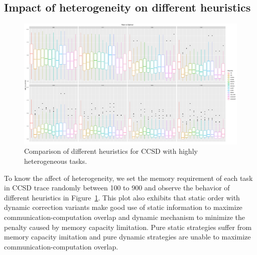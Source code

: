 \documentclass[sigconf]{acmart}
\begin{document}
{	%
	
	\subsection{Impact of heterogeneity on different heuristics}
	\begin{figure}[htb]
		\includegraphics[scale=0.25]{./results/plots/ratio_to_optimal_random_selected_ccsd.pdf}
		\caption{Comparison of different heuristics for CCSD with highly heterogeneous tasks.}
		\label{fig:ratio_to_optimal_ccsd_random}
	\end{figure}	
	
	
	To know the affect of heterogeneity, we set the memory requirement of each task in CCSD trace randomly between 100 to 900 and observe the behavior of different heuristics in  Figure~\ref{fig:ratio_to_optimal_ccsd_random}. This plot also exhibits that static order with dynamic correction variants make good use of static information to maximize communication-computation overlap and dynamic mechanism to minimize the penalty caused by memory capacity limitation. Pure static strategies suffer from memory capacity imitation and pure dynamic strategies are unable to maximize communication-computation overlap.
	
}
\end{document}
